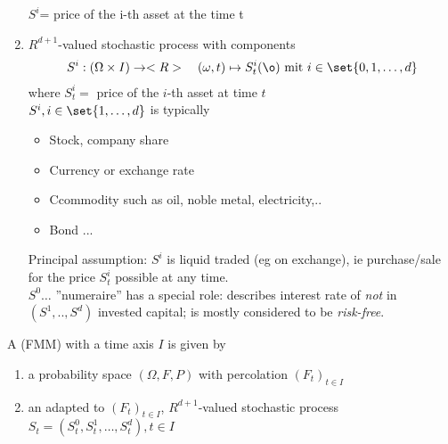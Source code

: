 \begin{enumerate}
	\newline $S^i$= price of the i-th asset at the time t
	\item {} $R^{d+1}$-valued  stochastic process with components
	\begin{align*}
		S^i: (\Omega \times I) \to \R\quad (\omega,t) \mapsto S^i_t(\o) \mit i \in \set{0,1,\dots,d}
	\end{align*} 
	where $S^i_t=$ price of the $i$-th asset at time $t$\\
	$S^i, i \in \set{1,\dots,d}$ is typically
	\begin{itemize}
		\item Stock, company share
		\item Currency or exchange rate
		\item Ccommodity such as oil, noble metal, electricity,..
		\item Bond ... 
	\end{itemize}
	Principal assumption: $S^i$ is liquid traded (eg on exchange), ie purchase/sale for the price $S_t^i$ possible at any time.\\
	
	$S^0\dots$ ''numeraire'' has a special role: describes interest rate of \emph{not} in $(S^1,..,S^d)$ invested capital; is mostly considered to be \emph{risk-free}.
\end{enumerate}

\begin{definition}
	A  (FMM) with a time axis $I$ is given by
	\begin{enumerate}
		\item a probability space $(\Omega, F,P)$ with percolation $(F_t)_{t\in I}$
		\item an adapted to $(F_t)_{t \in I}$, $R^{d+1}$-valued stochastic process $S_t = (S^0_t, S_t^1, \dots, S^d_t),t \in I$
	\end{enumerate} 
\end{definition}

